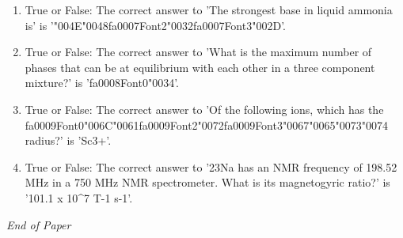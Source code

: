 \documentclass[12pt]{article}
\begin{document}
\begin{enumerate}[label=\arabic*.]
\item True or False: The correct answer to 'The strongest base in liquid ammonia is' is '{\char"004E}{\char"0048}{\csname fa0007Font2\endcsname\char"0032}{\csname fa0007Font3\endcsname\char"002D}'.
\item True or False: The correct answer to 'What is the maximum number of phases that can be at equilibrium with each other in a three component mixture?' is '{\csname fa0008Font0\endcsname\char"0034}'.
\item True or False: The correct answer to 'Of the following ions, which has the {\csname fa0009Font0\endcsname\char"006C}{\char"0061}{\csname fa0009Font2\endcsname\char"0072}{\csname fa0009Font3\endcsname\char"0067}{\char"0065}{\char"0073}{\char"0074} radius?' is 'Sc3+'.
\item True or False: The correct answer to '23Na has an NMR frequency of 198.52 MHz in a 750 MHz NMR spectrometer. What is its magnetogyric ratio?' is '101.1 x 10\^{}7 T-1 s-1'.
\end{enumerate}

\vfill
\noindent\textit{End of Paper}
\end{document}

